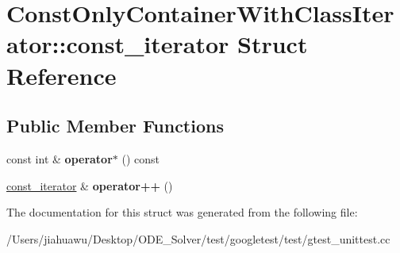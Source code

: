\hypertarget{struct_const_only_container_with_class_iterator_1_1const__iterator}{}\section{Const\+Only\+Container\+With\+Class\+Iterator\+:\+:const\+\_\+iterator Struct Reference}
\label{struct_const_only_container_with_class_iterator_1_1const__iterator}
\subsection*{Public Member Functions}
\begin{DoxyCompactItemize}
\item 
\mbox{\label{struct_const_only_container_with_class_iterator_1_1const__iterator_ac0e11dc5624359e4d13a9dfcc56586bc}} 
const int \& {\bfseries operator$\ast$} () const
\item 
\mbox{\label{struct_const_only_container_with_class_iterator_1_1const__iterator_a99150bd6377f80d9944b95aa2a5c7805}} 
\mbox{\hyperlink{struct_const_only_container_with_class_iterator_1_1const__iterator}{const\+\_\+iterator}} \& {\bfseries operator++} ()
\end{DoxyCompactItemize}


The documentation for this struct was generated from the following file\+:\begin{DoxyCompactItemize}
\item 
/\+Users/jiahuawu/\+Desktop/\+O\+D\+E\+\_\+\+Solver/test/googletest/test/gtest\+\_\+unittest.\+cc\end{DoxyCompactItemize}
